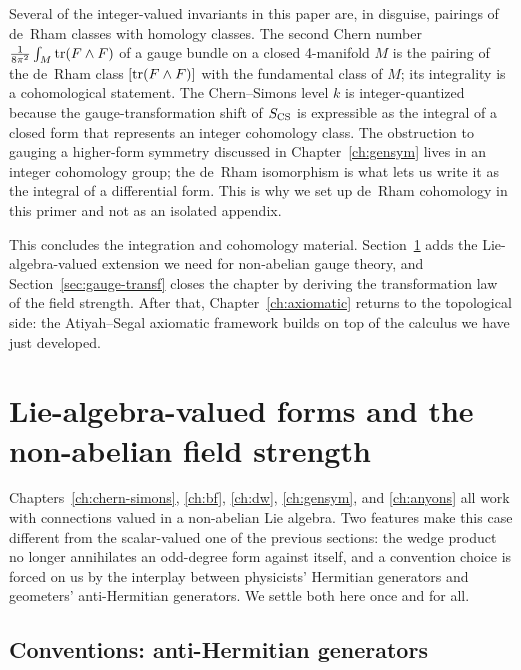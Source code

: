 \begin{remark}\label{rem:deRham-physics}
Several of the integer-valued invariants in this paper are, in disguise, pairings of de~Rham classes with homology classes. The second Chern number $\tfrac{1}{8\pi^2}\int_M \operatorname{tr}(F \wedge F)$ of a gauge bundle on a closed 4-manifold $M$ is the pairing of the de~Rham class $[\operatorname{tr}(F \wedge F)]$ with the fundamental class of $M$; its integrality is a cohomological statement. The Chern--Simons level $k$ is integer-quantized because the gauge-transformation shift of $S_{\operatorname{CS}}$ is expressible as the integral of a closed form that represents an integer cohomology class. The obstruction to gauging a higher-form symmetry discussed in Chapter~\ref{ch:gensym} lives in an integer cohomology group; the de~Rham isomorphism is what lets us write it as the integral of a differential form. This is why we set up de~Rham cohomology in this primer and not as an isolated appendix.
\end{remark}

\medskip

\noindent This concludes the integration and cohomology material. Section~\ref{sec:lie-forms} adds the Lie-algebra-valued extension we need for non-abelian gauge theory, and Section~\ref{sec:gauge-transf} closes the chapter by deriving the transformation law of the field strength. After that, Chapter~\ref{ch:axiomatic} returns to the topological side: the Atiyah--Segal axiomatic framework builds on top of the calculus we have just developed.


\section{Lie-algebra-valued forms and the non-abelian field strength}\label{sec:lie-forms}

Chapters~\ref{ch:chern-simons}, \ref{ch:bf}, \ref{ch:dw}, \ref{ch:gensym}, and \ref{ch:anyons} all work with connections valued in a non-abelian Lie algebra. Two features make this case different from the scalar-valued one of the previous sections: the wedge product no longer annihilates an odd-degree form against itself, and a convention choice is forced on us by the interplay between physicists' Hermitian generators and geometers' anti-Hermitian generators. We settle both here once and for all.

\subsection{Conventions: anti-Hermitian generators}\label{sec:anti-hermitian-conv}

